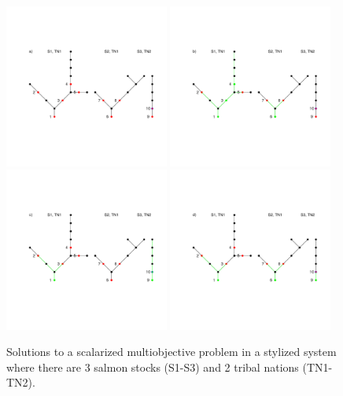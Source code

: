 \documentclass[12pt]{elsarticle}
\begin{document}
\begin{figure}
\includegraphics[width=0.48\textwidth]{figures/opt_s.pdf}
\includegraphics[width=0.48\textwidth]{figures/opt_h.pdf}
\includegraphics[width=0.48\textwidth]{figures/opt_e.pdf}
\includegraphics[width=0.48\textwidth]{figures/opt_d.pdf} 
\caption{Solutions to a scalarized multiobjective problem in a stylized system where there are 3 salmon stocks (S1-S3) and 2 tribal nations (TN1-TN2). \label{fig:opt}}
\end{figure}%
\end{document}

